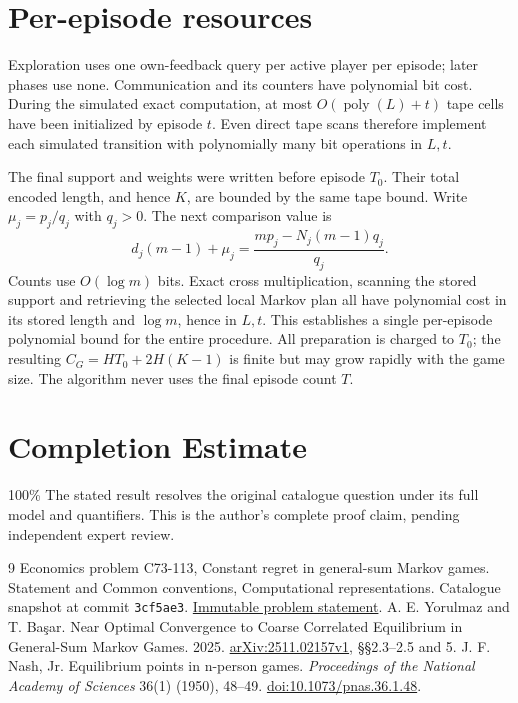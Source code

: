 \documentclass[11pt]{article}
\begin{document}
\section{Per-episode resources}
Exploration uses one own-feedback query per active player per episode;
later phases use none. Communication and its counters have polynomial
bit cost. During the simulated exact computation, at most
$O(\operatorname{poly}(L)+t)$ tape cells have been initialized by episode
$t$. Even direct tape scans therefore implement each simulated transition
with polynomially many bit operations in $L,t$.

The final support and weights were written before episode $T_0$.
Their total encoded length, and hence $K$, are bounded by the same tape
bound. Write $\mu_j=p_j/q_j$ with $q_j>0$. The next comparison value is
\[
          d_j(m-1)+\mu_j
             =\frac{m p_j-N_j(m-1)q_j}{q_j}.
\]
Counts use $O(\log m)$ bits. Exact cross multiplication, scanning the
stored support and retrieving the selected local Markov plan all have
polynomial cost in its stored length and $\log m$, hence in $L,t$.
This establishes a single per-episode polynomial bound for the entire
procedure. All preparation is charged to $T_0$; the resulting
$C_G=H T_0+2H(K-1)$ is finite but may grow rapidly with the game size.
The algorithm never uses the final episode count $T$.

\section*{Completion Estimate}
100\%
The stated result resolves the original catalogue question under its full
model and quantifiers. This is the author's complete proof claim, pending
independent expert review.

\begin{thebibliography}{9}
 Economics problem C73-113, Constant regret in
general-sum Markov games. Statement and Common conventions,
Computational representations. Catalogue snapshot at commit
\texttt{3cf5ae3}.
\href{https://github.com/mehmetmars7/Erdosproblems-llm-hunter/blob/3cf5ae39f671cb748fa7ba6d0ccc253611620f9d/attacks/open_problems/economics/statements/C73-113.tex}{Immutable problem statement}.
 A. E. Yorulmaz and T. Ba\c{s}ar.
Near Optimal Convergence to Coarse Correlated Equilibrium in
General-Sum Markov Games. 2025.
\href{https://arxiv.org/html/2511.02157v1}{arXiv:2511.02157v1},
\S\S2.3--2.5 and 5.
 J. F. Nash, Jr. Equilibrium points in n-person games.
\emph{Proceedings of the National Academy of Sciences} 36(1)
(1950), 48--49.
\href{https://doi.org/10.1073/pnas.36.1.48}{doi:10.1073/pnas.36.1.48}.
\end{thebibliography}
\end{document}
